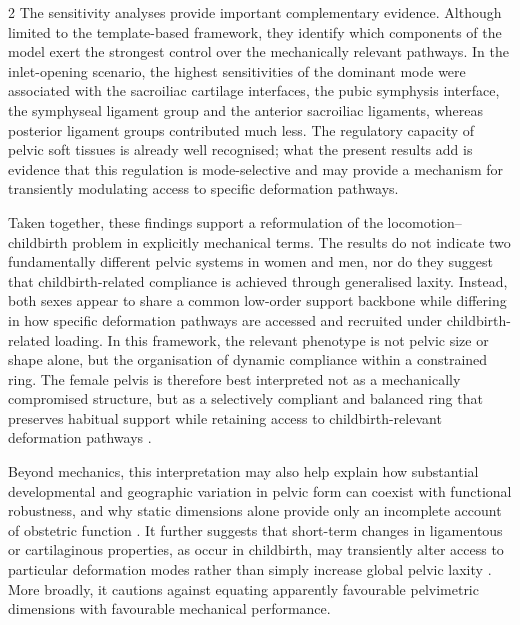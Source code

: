 \documentclass[openacc]{rsproca_new}
\begin{document}
\begin{multicols}{2}
The sensitivity analyses provide important complementary evidence. Although limited to the template-based framework, they identify which components of the model exert the strongest control over the mechanically relevant pathways. In the inlet-opening scenario, the highest sensitivities of the dominant mode were associated with the sacroiliac cartilage interfaces, the pubic symphysis interface, the symphyseal ligament group and the anterior sacroiliac ligaments, whereas posterior ligament groups contributed much less. The regulatory capacity of pelvic soft tissues is already well recognised; what the present results add is evidence that this regulation is mode-selective and may provide a mechanism for transiently modulating access to specific deformation pathways.

Taken together, these findings support a reformulation of the locomotion--childbirth problem in explicitly mechanical terms. The results do not indicate two fundamentally different pelvic systems in women and men, nor do they suggest that childbirth-related compliance is achieved through generalised laxity. Instead, both sexes appear to share a common low-order support backbone while differing in how specific deformation pathways are accessed and recruited under childbirth-related loading. In this framework, the relevant phenotype is not pelvic size or shape alone, but the organisation of dynamic compliance within a constrained ring. The female pelvis is therefore best interpreted not as a mechanically compromised structure, but as a selectively compliant and balanced ring that preserves habitual support while retaining access to childbirth-relevant deformation pathways \cite{Pavlicev2020,Haeusler2021,Grunstra2023,Warrener2015}.

Beyond mechanics, this interpretation may also help explain how substantial developmental and geographic variation in pelvic form can coexist with functional robustness, and why static dimensions alone provide only an incomplete account of obstetric function \cite{BettiManica2018,Auerbach2018,VerbruggenNowlan2017,Novak2020,KurkiDecrausaz2015}. It further suggests that short-term changes in ligamentous or cartilaginous properties, as occur in childbirth, may transiently alter access to particular deformation modes rather than simply increase global pelvic laxity \cite{Vleeming2012,Kiapour2019,Stolarczyk2021}. More broadly, it cautions against equating apparently favourable pelvimetric dimensions with favourable mechanical performance.


\end{multicols}
\end{document}
